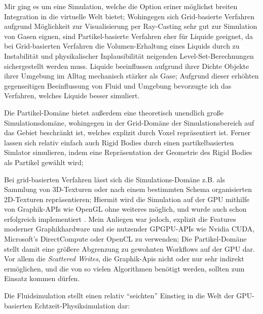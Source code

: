Mir ging es um eine Simulation, welche die Option eriner möglichst breiten Integration in die virtuelle Welt bietet; Wohingegen sich Grid-basierte Verfahren aufgrund Möglichkeit zur Visualisierung per Ray-Casting sehr gut zur Simulation von Gasen eignen, 
sind Partikel-basierte Verfahren eher für Liquide geeignet, da bei Grid-basierten Verfahren die Volumen-Erhaltung eines Liquids durch zu Instabilität und physikalischer Inplausibilität neigenden Level-Set-Berechnungen sichergestellt werden muss. 
Liquide beeinflussen aufgrund ihrer Dichte Objekte ihrer Umgebung im Alltag mechanisch stärker als Gase; Aufgrund dieser erhöhten gegenseitigen Beeinflussung von Fluid und Umgebung bevorzugte ich das Verfahren, welches Liquide besser simuliert.

Die Partikel-Domäne bietet außerdem eine theoretisch unendlich große Simulationsdomäne, wohingegen in der Grid-Domäne der Simulationsbereich auf das Gebiet beschränkt ist, welches explizit durch Voxel repräsentiert ist.
Ferner lassen sich relativ einfach auch Rigid Bodies durch einen partikelbasierten Simlator simulieren, indem eine Repräsentation der Geometrie des Rigid Bodies als Partikel gewählt wird; 

Bei grid-basierten Verfahren lässt sich die Simulations-Domäne z.B. als Sammlung von 3D-Texturen oder nach einem bestimmten Schema organisierten 2D-Texturen repräsentieren; Hiermit wird die Simulation auf der GPU mithilfe von Graphik-APIs wie OpenGL ohne weiteres möglich, und wurde auch schon erfolgreich implementiert . Mein Anliegen war jedoch, explizit die Features moderner Graphikhardware und sie nutzender GPGPU-APIs wie Nvidia CUDA, Microsoft's DirectCompute oder OpenCL zu verwenden; Die Partikel-Domäne stellt damit eine größere Abgrenzung zu gewohnten Workflows auf der GPU dar. Vor allem die \emph{Scattered Writes}, die Graphik-Apis nicht oder nur sehr indirekt ermöglichen,  
und die von so vielen Algorithmen benötigt werden, sollten zum Einsatz kommen dürfen.

Die Fluidsimulation stellt einen relativ "`seichten"' Einstieg in die Welt der GPU-basierten Echtzeit-Physiksimulation dar:

